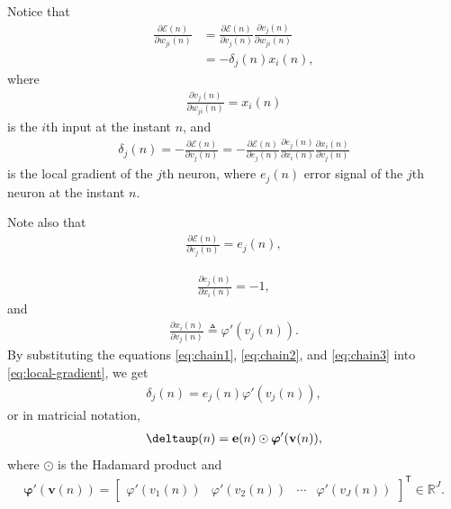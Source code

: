 \documentclass[12pt,a4paper]{article}
\newcommand{\trans}{\mathsf{T}}
\newcommand{\Real}{\mathbb{R}}
\begin{document}
Notice that
\begin{align}
    \frac{\partial \mathscr{E}(n)}{\partial w_{ji}(n)} & = \frac{\partial \mathscr{E}(n)}{\partial v_{j}(n)} \frac{\partial v_j(n)}{\partial w_{ji}(n)} \nonumber \\
    & = - \delta_j (n) x_i(n),
    \label{eq:cost-function}
\end{align}
where
\begin{align}
    \frac{\partial v_j(n)}{\partial w_{ji}(n)} = x_i(n)
    \label{eq:chain4}
\end{align}
is the \(i\)th input at the instant \(n\), and
\begin{align}
    \delta_j (n) = - \frac{\partial \mathscr{E}(n)}{\partial v_{j}(n)} = - \frac{\partial \mathscr{E}(n)}{\partial e_{j}(n)} \frac{\partial e_j(n)}{\partial x_i(n)} \frac{\partial x_i(n)}{\partial v_{j}(n)}
    \label{eq:local-gradient}
\end{align}
is the local gradient of the \(j\)th neuron, where \(e_{j}(n)\) error signal of the \(j\)th neuron at the instant \(n\).

Note also that
\begin{align}
    \frac{\partial \mathscr{E}(n)}{\partial e_{j}(n)} = e_{j}(n),
    \label{eq:chain1}
\end{align}

\begin{align}
    \frac{\partial e_j(n)}{\partial x_i(n)} = -1,
    \label{eq:chain2}
\end{align}
and
\begin{align}
    \frac{\partial x_i(n)}{\partial v_{j}(n)} \triangleq \varphi'(v_{j}(n)).
    \label{eq:chain3}
\end{align}
By substituting the equations \eqref{eq:chain1}, \eqref{eq:chain2}, and \eqref{eq:chain3} into \eqref{eq:local-gradient}, we get
\begin{align}
    \delta_j (n) = e_{j}(n) \varphi'(v_{j}(n)),
\end{align}
or in matricial notation,
\begin{align}
    \boldsymbol{\deltaup}(n) = \mathbf{e}(n) \odot \boldsymbol{\varphi}'(\mathbf{v}(n)),
\end{align}
where \(\odot\) is the Hadamard product and
\begin{align}
    \boldsymbol{\varphi}'(\mathbf{v}(n)) = \begin{bmatrix}
        \varphi'(v_1(n)) & \varphi'(v_2(n)) & \cdots & \varphi'(v_J(n))
    \end{bmatrix}^\trans \in \Real^{J}.
\end{align}
\end{document}
